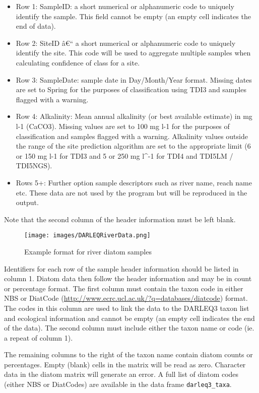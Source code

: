 \documentclass[]{article}
\newcommand{\euro}{€}
\begin{document}
\begin{itemize}
\item
  Row 1: SampleID: a short numerical or alphanumeric code to uniquely
  identify the sample. This field cannot be empty (an empty cell
  indicates the end of data).
\item
  Row 2: SiteID â\euro{}`` a short numerical or alphanumeric code to
  uniquely identify the site. This code will be used to aggregate
  multiple samples when calculating confidence of class for a site.
\item
  Row 3: SampleDate: sample date in Day/Month/Year format. Missing dates
  are set to Spring for the purposes of classification using TDI3 and
  samples flagged with a warning.
\item
  Row 4: Alkalinity: Mean annual alkalinity (or best available estimate)
  in mg l-1 (CaCO3). Missing values are set to 100 mg l-1 for the
  purposes of classification and samples flagged with a warning.
  Alkalinity values outside the range of the site prediction algorithm
  are set to the appropriate limit (6 or 150 mg l-1 for TDI3 and 5 or
  250 mg l\^{}-1 for TDI4 and TDI5LM / TDI5NGS).
\item
  Rows 5+: Further option sample descriptors such as river name, reach
  name etc. These data are not used by the program but will be
  reproduced in the output.
\end{itemize}

Note that the second column of the header information must be left
blank.

\begin{figure}
\centering
\texttt{[image: images/DARLEQRiverData.png]}
\caption{Example format for river diatom samples}
\end{figure}

Identifiers for each row of the sample header information should be
listed in column 1. Diatom data then follow the header information and
may be in count or percentage format. The first column must contain the
taxon code in either NBS or DiatCode
(\url{http://www.ecrc.ucl.ac.uk/?q=databases/diatcode}) format. The
codes in this column are used to link the data to the DARLEQ3 taxon list
and ecological information and cannot be empty (an empty cell indicates
the end of the data). The second column must include either the taxon
name or code (ie. a repeat of column 1).

The remaining columns to the right of the taxon name contain diatom
counts or percentages. Empty (blank) cells in the matrix will be read as
zero. Character data in the diatom matrix will generate an error. A full
list of diatom codes (either NBS or DiatCodes) are available in the data
frame \texttt{darleq3\_taxa}.
\end{document}
